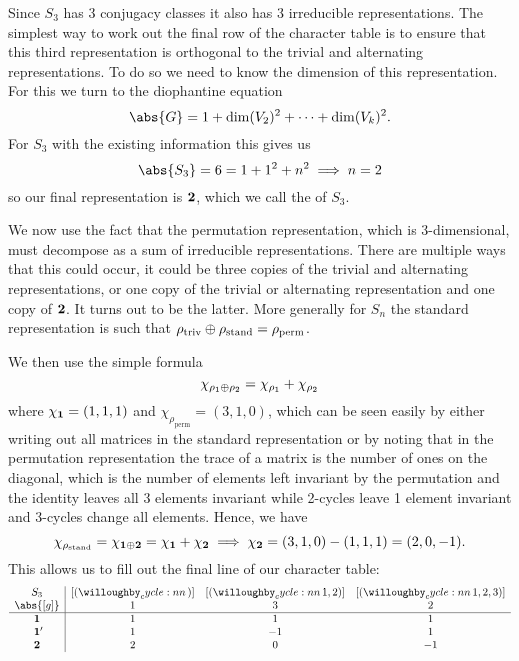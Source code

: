Since \(S_3\) has 3 conjugacy classes it also has 3 irreducible
representations.
The simplest way to work out the final row of the character table is to
ensure that this third representation is orthogonal to the trivial and
alternating representations.
To do so we need to know the dimension of this representation.
For this we turn to the diophantine equation
\begin{equation}
    \abs{G} = 1 + \dim(V_2)^2 + \dotsb + \dim(V_k)^2.
\end{equation}
For \(S_3\) with the existing information this gives us
\begin{equation}
    \abs{S_3} = 6 = 1 + 1^2 + n^2 \implies n = 2
\end{equation}
so our final representation is \(\mathbf{2}\), which we call the
 of \(S_3\).

We now use the fact that the permutation representation, which is 3-dimensional, must decompose as a sum of irreducible representations.
There are multiple ways that this could occur, it could be three copies of the trivial and alternating representations, or one copy of the trivial or alternating representation and one copy of \(\mathbf{2}\).
It turns out to be the latter.
More generally for \(S_n\) the standard representation is such that \(\rho_{\mathrm{triv}} \oplus \rho_{\mathrm{stand}} = \rho_{\mathrm{perm}}\).

We then use the simple formula
\begin{equation}
    \chi_{\rho_1 \oplus \rho_2} = \chi_{\rho_1} + \chi_{\rho_2}
\end{equation}
where \(\chi_{\mathbf{1}} = (1, 1, 1)\) and \(\chi_{\rho_{\mathrm{perm}}} = (3,
1, 0)\), which can be seen easily by either writing out all matrices in the standard representation or by noting that in the permutation representation the trace of a matrix is the number of ones on the diagonal, which is the number of elements left invariant by the permutation and the identity leaves all 3 elements invariant while 2-cycles leave 1 element invariant and 3-cycles change all elements.
Hence, we have
\begin{equation}
    \chi_{\rho_{\mathrm{stand}}} = \chi_{\mathbf{1} \oplus \mathbf{2}} =
    \chi_{\mathbf{1}} + \chi_{\mathbf{2}} \implies \chi_{\mathbf{2}} = (3, 1, 0) - (1, 1, 1)
    = (2, 0, -1).
\end{equation}
This allows us to fill out the final line of our character table:
\begin{equation}
    \begin{array}{c|ccc}
        S_3 & [\cycle{}] & [\cycle{1,2}] & [\cycle{1,2,3}]\\
        \abs{[g]} & 1 & 3 & 2 \\ \hline
        \rep{1} & 1 & 1 & 1 \\
        \rep{1}\mathrlap{'} & 1 & -1 & 1\\
        \rep{2} & 2 & 0 & -1
    \end{array}
\end{equation}

